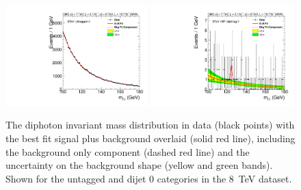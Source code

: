 \begin{figure}
  \includegraphics[width=0.49\textwidth]{results/plots/mgg-cats/mgg_mva_nosub_ch2_cat4_8TeV.pdf}
  \includegraphics[width=0.49\textwidth]{results/plots/mgg-cats/mgg_mva_nosub_ch2_cat5_8TeV.pdf}
  \caption[The diphoton invariant mass distribution in data with the best fit signal plus background overlaid for the untagged and dijet 0 categories in the 8~TeV dataset]{The diphoton invariant mass distribution in data (black points) with the best fit signal plus background overlaid (solid red line), including the background only component (dashed red line) and the uncertainty on the background shape (yellow and green bands). Shown for the untagged and dijet 0 categories in the 8~TeV dataset.}
  \label{fig:bfres3}
\end{figure}

